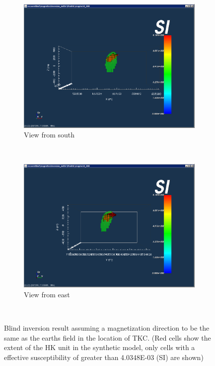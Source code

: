\begin{figure}
    \centering
    \begin{subfigure}[b]{0.8\textwidth}
        \includegraphics[width=\textwidth]{images/TKC/blindIndDirSouth.PNG}
        \caption{View from south}
        \label{fig:blindIndDirSouth}
    \end{subfigure}
    ~ %
    \begin{subfigure}[b]{0.8\textwidth}
        \includegraphics[width=\textwidth]{images/TKC/blindIndDirEast.PNG}
        \caption{View from east}
        \label{fig:blindIndDirEast}
    \end{subfigure}
    ~ %
   \caption{Blind inversion result assuming a magnetization direction to be the same as the earths field in the location of TKC. (Red cells show the extent of the HK unit in the synthetic model, only cells with a effective susceptibility of greater than 4.0348E-03 (SI) are shown)}
   \label{fig:blindIndDir}
\end{figure}

